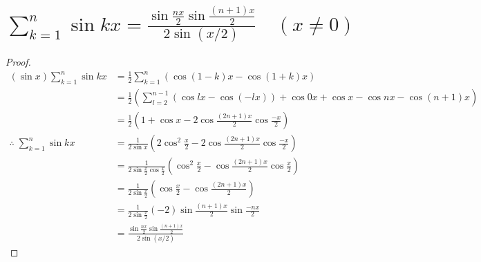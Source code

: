    \section{\texorpdfstring{$\sum_{k=1}^n \sin kx = \frac{\sin\frac{nx}{2}\sin\frac{(n+1)x}{2}}{2\sin(x/2)} \quad (x\neq 0)$}{Σ\_\{k=1\}\string^n sin(kx) = (sin(nx/2)sin((n+1)x/2))/(2sin(x/2))}}
        \begin{proof}
            \begin{align*}
                (\sin x) \sum_{k=1}^n \sin kx &= \frac{1}{2}\sum_{k=1}^n (\cos(1-k)x-\cos(1+k)x) \\
                &= \frac{1}{2}\left(\sum_{l=2}^{n-1}(\cos lx - \cos(-lx)) + \cos 0x + \cos x - \cos nx - \cos (n+1)x \right) \\
                &= \frac{1}{2}\left(1 + \cos x - 2\cos\frac{(2n+1)x}{2}\cos\frac{-x}{2}\right) \\
                \therefore\; \sum_{k=1}^n \sin kx &= \frac{1}{2\sin x}\left(2\cos^2\frac{x}{2} - 2\cos\frac{(2n+1)x}{2}\cos\frac{-x}{2}\right) \\
                &= \frac{1}{2\sin\frac{x}{2}\cos\frac{x}{2}}\left(\cos^2\frac{x}{2} - \cos\frac{(2n+1)x}{2}\cos\frac{x}{2}\right) \\
                &= \frac{1}{2\sin\frac{x}{2}}\left(\cos\frac{x}{2} - \cos\frac{(2n+1)x}{2}\right) \\
                &= \frac{1}{2\sin\frac{x}{2}}(-2)\sin\frac{(n+1)x}{2}\sin\frac{-nx}{2} \\
                &= \frac{\sin\frac{nx}{2}\sin\frac{(n+1)x}{2}}{2\sin(x/2)}
            \end{align*}
        \end{proof}